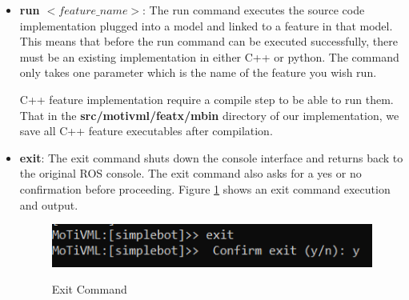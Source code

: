 \documentclass{article}
\begin{document}
\begin{itemize}
	\item \textbf{run $<feature\_name>$}: The run command executes the source code implementation plugged into a model and linked to a feature in that model. This means that before the run command can be executed successfully, there must be an existing implementation in either C++ or python. The command only takes one parameter which is the name of the feature you wish run.
	
	C++ feature implementation require a compile step to be able to run them. That in the \textbf{src/motivml/featx/mbin} directory of our implementation, we save all C++ feature executables after compilation.
	
	\item \textbf{exit}: The exit command shuts down the console interface and returns back to the original ROS console. The exit command also asks for a yes or no confirmation before proceeding. Figure \ref{exit} shows an exit command execution and output.
	\begin{figure}[H]
		\caption{Exit Command}
		\centering
		\includegraphics[width=\columnwidth]{images/exit.png}
		\label{exit}
	\end{figure}
\end{itemize}
\end{document}
